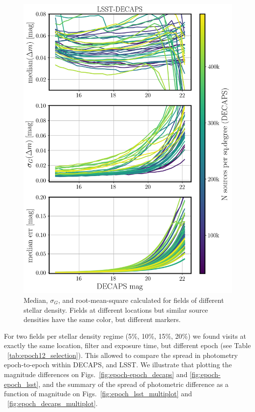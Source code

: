 \documentclass[DM,lsstdraft,toc,usenatbib]{lsstdoc}
\begin{document}
\begin{figure}
\includegraphics[width=1.0\columnwidth]{figs/decaps_lsst_rms_plot.png}
\caption{Median, $\sigma_{G}$, and root-mean-square calculated for fields of different stellar density. Fields at different locations but similar source densities have the same color, but different markers. }
\label{fig:dmag_spread}
\end{figure} 



For two fields per  stellar density regime (5\%, 10\%, 15\%, 20\%) we found visits at exactly the same location, filter and exposure time, but different epoch (see Table ~\ref{tab:epoch12_selection}).  This allowed to compare the spread in photometry epoch-to-epoch  within DECAPS, and LSST. We illustrate that plotting the magnitude differences on Figs.~\ref{fig:epoch-epoch_decaps} and \ref{fig:epoch-epoch_lsst}, and the summary of the spread of photometric difference as a function of magnitude on Figs.~\ref{fig:epoch_lsst_multiplot} and ~\ref{fig:epoch_decaps_multiplot}. 
\end{document}
